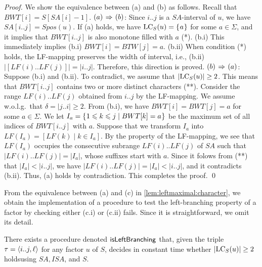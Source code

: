 \begin{proof}
  We show the equivalence between (a) and (b) as follows.
  Recall that $BWT[i] = S[SA[i]-1]$. 
$(a)\Implies (b)$: 
Since $i..j$ is a $SA$-interval of $u$, we have $SA[i..j]=Spos(u)$. If (a) holds, we have 
$\LC(u) = \set{a}$ for some $a\in \Sigma$, and it implies that $BWT[i..j]$ is also monotone filled with $a$ (*). 
(b.i) This immediately implies (b.i) $BWT[i]=BTW[j] = a$. 
(b.ii) When condition (*) holds, the LF-mapping preserves the width of interval, i.e., (b.ii) $|[LF(i)..LF(j)]| = |i..j|$. Therefore, this direction is proved. 
$(b) \Implies (a)$: 
Suppose (b.i) and (b.ii). To contradict, we assume that $|\LC(u)|\ge 2$. This means that $BWT[i..j]$ contains two or more distinct characters (**). 
Consider the range $LF(i)..LF(j)$ obtained from $i..j$ by the LF-mapping. We assume w.o.l.g.~that $\delta = |j..i|\ge 2$. 
From (b.i), we have $BWT[i] = BWT[j] = a$ for some $a \in \Sigma$. 
We let $I_a = \set{\btw k1j \mid BWT[k] = a}$ be the maximum set of all indices of $BWT[i..j]$ with $a$. 
Suppose that we transform $I_a$ into $LF(I_a) = [ LF(k) \mid k \in I_a]$. By the property of the LF-mapping, we see that $LF(I_a)$ occupies the consecutive subrange $LF(i)..LF(j)$ of $SA$ such that $|LF(i)..LF(j)| = |I_a|$, whose suffixes start with $a$. Since it folows from (**) that $|I_a| < |i..j|$, we have $|LF(i)..LF(j)| = |I_a|< |i..j|$, and it contradicts (b.ii). Thus, (a) holds by contradiction. This completes the proof. 
\qed\end{proof}

From the equivalence between (a) and (c) in \cref{lem:leftmaximal:character}, we obtain the implementation of a procedure to test the left-branching property of a factor by checking either (c.i) or (c.ii) fails. Since it is straightforward, we omit its detail. 

\begin{lemma}\label{lem:test:leftbranch}
There exists a procedure denoted  $\isLeftBranching[]$ that, given the triple $\tau = \pair{i..j, \ell}$ for any factor $u$ of $S$, decides  in constant time whether $|\LC(u)|\ge 2$ holdsusing $SA, ISA$, and $S$. 
\end{lemma}



